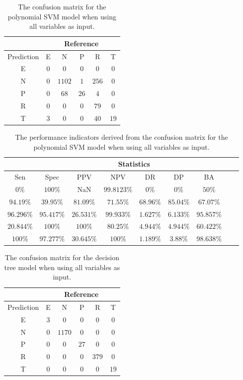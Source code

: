 \begin{table}[!ht]
	\centering
	\begin{tabular}{|c|c|c|c|c|c|}
		\hline
		 & \multicolumn{5}{|c|}{Reference} \\ \hline
		 Prediction & E & N & P & R & T \\ \hline
		 E & $0$ & $0$ & $0$ & $0$ & $0$ \\ \hline
		 N & $0$ & $1102$ & $1$ & $256$ & $0$ \\ \hline
		 P & $0$ & $68$ & $26$ & $4$ & $0$ \\ \hline
		 R & $0$ & $0$ & $0$ & $79$ & $0$ \\ \hline
		 T & $3$ & $0$ & $0$ & $40$ & $19$ \\ \hline
	\end{tabular}
	\caption{The confusion matrix for the polynomial SVM model when using all variables as input.}
	\label{tab:cm:all:svmPoly}
\end{table}

\begin{table}[!ht]
	\centering
	\begin{tabular}{|c|c|c|c|c|c|c|c|c|}
		\hline
		 & \multicolumn{7}{c|}{Statistics} \\ \hline
		Sen & Spec & PPV & NPV & DR & DP & BA \\ \hline
		$0\%$ & $100\%$ & NaN & $99.8123\%$ & $0\%$ & $0\%$ & $50\%$ \\ \hline
		$94.19\%$ & $39.95\%$ & $81.09\%$ & $71.55\%$ & $68.96\%$ & $85.04\%$ & $67.07\%$ \\ \hline
		$96.296\%$ & $95.417\%$ & $26.531\%$ & $99.933\%$ & $1.627\%$ & $6.133\%$ & $95.857\%$ \\ \hline
		$20.844\%$ & $100\%$ & $100\%$ & $80.25\%$ & $4.944\%$ & $4.944\%$ & $60.422\%$ \\ \hline
		$100\%$ & $97.277\%$ & $30.645\%$ & $100\%$ & $1.189\%$ & $3.88\%$ & $98.638\%$ \\ \hline
	\end{tabular}
	\caption{The performance indicators derived from the confusion matrix for the polynomial SVM model when using all variables as input.}
	\label{tab:cs:all:svmPoly}
\end{table}

\begin{table}[!ht]
	\centering
	\begin{tabular}{|c|c|c|c|c|c|}
		\hline
		 & \multicolumn{5}{|c|}{Reference} \\ \hline
		 Prediction & E & N & P & R & T \\ \hline
		 E & $3$ & $0$ & $0$ & $0$ & $0$ \\ \hline
		 N & $0$ & $1170$ & $0$ & $0$ & $0$ \\ \hline
		 P & $0$ & $0$ & $27$ & $0$ & $0$ \\ \hline
		 R & $0$ & $0$ & $0$ & $379$ & $0$ \\ \hline
		 T & $0$ & $0$ & $0$ & $0$ & $19$ \\ \hline
	\end{tabular}
	\caption{The confusion matrix for the decision tree model when using all variables as input.}
	\label{tab:cm:all:C5.0}
\end{table}

